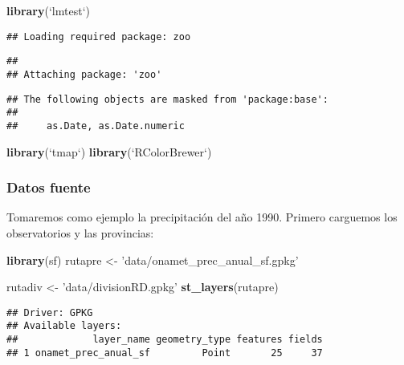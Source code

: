 \documentclass[11pt,]{article}
\newenvironment{Shaded}{\begin{snugshade}}{\end{snugshade}}
\newcommand{\KeywordTok}[1]{\textcolor[rgb]{0.13,0.29,0.53}{\textbf{#1}}}
\newcommand{\DataTypeTok}[1]{\textcolor[rgb]{0.13,0.29,0.53}{#1}}
\newcommand{\StringTok}[1]{\textcolor[rgb]{0.31,0.60,0.02}{#1}}
\newcommand{\NormalTok}[1]{#1}
\begin{document}
\begin{Shaded}
\begin{Highlighting}[]
\KeywordTok{library}\NormalTok{(}\StringTok{`}\DataTypeTok{lmtest}\StringTok{`}\NormalTok{)}
\end{Highlighting}
\end{Shaded}

\begin{verbatim}
## Loading required package: zoo
\end{verbatim}

\begin{verbatim}
## 
## Attaching package: 'zoo'
\end{verbatim}

\begin{verbatim}
## The following objects are masked from 'package:base':
## 
##     as.Date, as.Date.numeric
\end{verbatim}

\begin{Shaded}
\begin{Highlighting}[]
\KeywordTok{library}\NormalTok{(}\StringTok{`}\DataTypeTok{tmap}\StringTok{`}\NormalTok{)}
\KeywordTok{library}\NormalTok{(}\StringTok{`}\DataTypeTok{RColorBrewer}\StringTok{`}\NormalTok{)}
\end{Highlighting}
\end{Shaded}

\subsubsection{Datos fuente}\label{datos-fuente}

Tomaremos como ejemplo la precipitación del año 1990. Primero carguemos
los observatorios y las provincias:

\begin{Shaded}
\begin{Highlighting}[]
\KeywordTok{library}\NormalTok{(sf)}
\NormalTok{rutapre <-}\StringTok{ 'data/onamet_prec_anual_sf.gpkg'}

\NormalTok{rutadiv <-}\StringTok{ 'data/divisionRD.gpkg'}
\KeywordTok{st_layers}\NormalTok{(rutapre)}
\end{Highlighting}
\end{Shaded}

\begin{verbatim}
## Driver: GPKG 
## Available layers:
##             layer_name geometry_type features fields
## 1 onamet_prec_anual_sf         Point       25     37
\end{verbatim}
\end{document}

